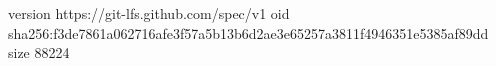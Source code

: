 version https://git-lfs.github.com/spec/v1
oid sha256:f3de7861a062716afe3f57a5b13b6d2ae3e65257a3811f4946351e5385af89dd
size 88224
